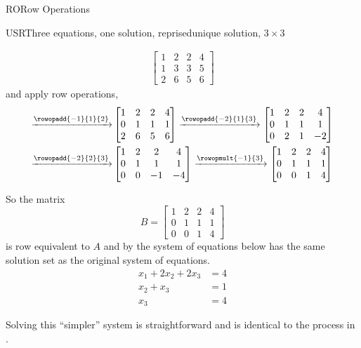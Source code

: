 \begin{subsect}{RO}{Row Operations}
\begin{example}{USR}{Three equations, one solution, reprised}{unique solution, $3\times 3$}
\begin{para}
\begin{align*}
\begin{bmatrix}
1&2&2&4\\
1&3&3&5\\
2&6&5&6
\end{bmatrix}
\end{align*}
%
and apply row operations,
%
\begin{align*}
\xrightarrow{\rowopadd{-1}{1}{2}}
&
\begin{bmatrix}
1&2&2&4\\
0&1&1&1\\
2&6&5&6
\end{bmatrix}
%
\xrightarrow{\rowopadd{-2}{1}{3}}
\begin{bmatrix}
1&2&2&4\\
0&1&1&1\\
0&2&1&-2
\end{bmatrix}\\
%
\xrightarrow{\rowopadd{-2}{2}{3}}
&
\begin{bmatrix}
1&2&2&4\\
0&1&1&1\\
0&0&-1&-4
\end{bmatrix}
%
\xrightarrow{\rowopmult{-1}{3}}
\begin{bmatrix}
1&2&2&4\\
0&1& 1&1\\
0&0&1&4
\end{bmatrix}
\end{align*}\end{para}
%
\begin{para}So the matrix
%
\begin{equation*}
B=\begin{bmatrix}
1&2&2&4\\
0&1& 1&1\\
0&0&1&4
\end{bmatrix}
\end{equation*}
is row equivalent to $A$
and by  the system of equations below has the same solution set as the original system of equations.
%
\begin{align*}
x_1+2x_2+2x_3&=4\\
x_2+ x_3&=1\\
x_3&=4
\end{align*}\end{para}
%
\begin{para}Solving this ``simpler'' system is straightforward and is identical to the process in .\end{para}
\end{example}
%
%
\end{subsect}
